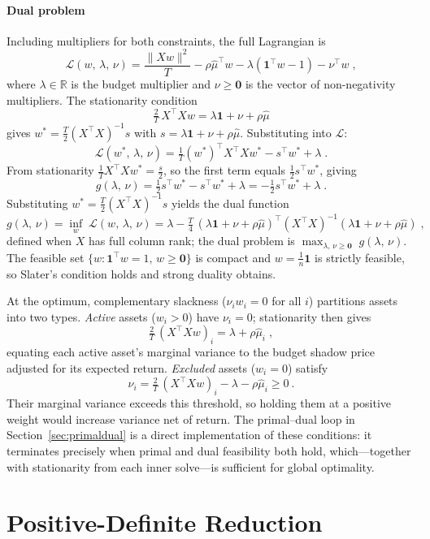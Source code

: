 \paragraph{Dual problem}
Including multipliers for both constraints, the full Lagrangian is
\[
\mathcal{L}(w,\, \lambda,\, \nu)
= \frac{\lVert Xw\rVert^2}{T} - \rho\hat\mu^\top w
  - \lambda(\mathbf{1}^\top w - 1) - \nu^\top w\;,
\]
where $\lambda\in\mathbb{R}$ is the budget multiplier and $\nu\geq\mathbf{0}$ is the vector of
non-negativity multipliers. The stationarity condition
\[
\tfrac{2}{T}\, X^\top X w = \lambda\mathbf{1}+\nu+\rho\hat\mu
\]
gives $w^* = \tfrac{T}{2}(X^\top X)^{-1}s$ with $s = \lambda\mathbf{1}+\nu+\rho\hat\mu$.
Substituting into $\mathcal{L}$:
\[
\mathcal{L}(w^*,\,\lambda,\,\nu)
= \tfrac{1}{T}(w^*)^\top X^\top X w^* - s^\top w^* + \lambda\;.
\]
From stationarity $\tfrac{1}{T}X^\top X w^* = \tfrac{s}{2}$, so the first term equals
$\tfrac{1}{2}s^\top w^*$, giving
\[
g(\lambda,\,\nu)
= \tfrac{1}{2}s^\top w^* - s^\top w^* + \lambda
= -\tfrac{1}{2}s^\top w^* + \lambda\;.
\]
Substituting $w^* = \tfrac{T}{2}(X^\top X)^{-1}s$ yields the dual function
\[
g(\lambda,\,\nu)
= \inf_w\; \mathcal{L}(w,\,\lambda,\,\nu)
= \lambda - \tfrac{T}{4}\,
  (\lambda\mathbf{1}+\nu+\rho\hat\mu)^\top(X^\top X)^{-1}
  (\lambda\mathbf{1}+\nu+\rho\hat\mu)\;,
\]
defined when $X$ has full column rank; the dual problem is
$\max_{\lambda,\,\nu\geq\mathbf{0}}\; g(\lambda,\,\nu)$.
The feasible set $\{w:\mathbf{1}^\top w=1,\,w\geq\mathbf{0}\}$ is compact and
$w=\tfrac{1}{n}\mathbf{1}$ is strictly feasible, so Slater's condition holds and
strong duality obtains.

At the optimum, complementary slackness ($\nu_i w_i = 0$ for all $i$) partitions assets
into two types. \emph{Active} assets ($w_i>0$) have $\nu_i=0$; stationarity then gives
\[
\tfrac{2}{T}\,(X^\top Xw)_i = \lambda+\rho\hat\mu_i\;,
\]
equating each active asset's marginal variance to the budget shadow price adjusted for its
expected return. \emph{Excluded} assets ($w_i=0$) satisfy
\[
\nu_i = \tfrac{2}{T}\,(X^\top Xw)_i - \lambda - \rho\hat\mu_i \geq 0~.
\]
Their marginal variance exceeds this threshold, so holding them at a positive weight would
increase variance net of return. The primal--dual loop in Section~\ref{sec:primaldual} is a direct
implementation of these conditions: it terminates precisely when primal and dual feasibility
both hold, which---together with stationarity from each inner solve---is sufficient for
global optimality.

\section{Positive-Definite Reduction}\label{sec:pd}

